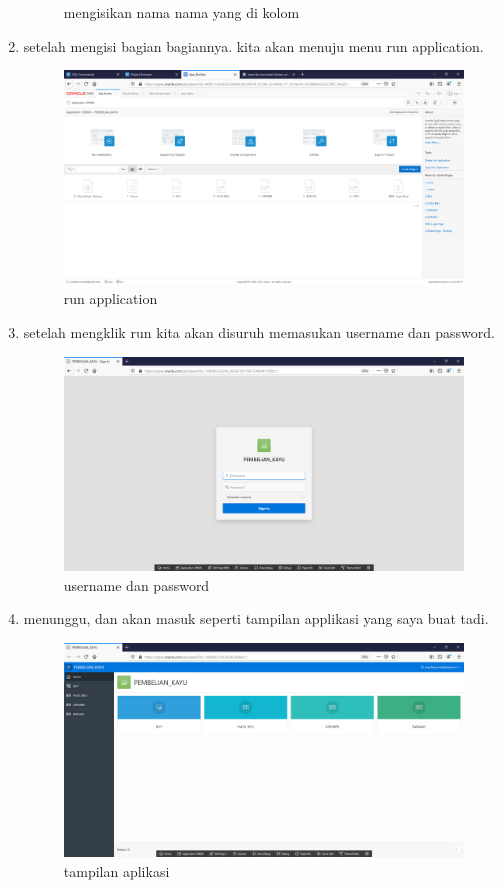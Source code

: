 \documentclass[12pt, a4paper]{report}
\begin{document}
\begin{enumerate}
\begin{figure}[h]
		\caption{mengisikan nama nama yang di kolom}
	\end{figure}
	\item setelah mengisi bagian bagiannya. kita akan menuju menu run application.
	\begin{figure}[h]
		\centering
		\includegraphics[scale=0.3]{figures/5.png}
		\caption{run application}
	\end{figure}
	\newpage
	\item setelah mengklik run kita akan disuruh memasukan username dan password.
	\begin{figure}[h]
		\centering
		\includegraphics[scale=0.3]{figures/6.png}
		\caption{username dan password}
	\end{figure}
	
	\item menunggu, dan akan masuk seperti tampilan applikasi yang saya buat tadi.
	\begin{figure}[h]
		\centering
		\includegraphics[scale=0.3]{figures/7.png}
		\caption{tampilan aplikasi}
	\end{figure}
\end{enumerate}
\end{document}
